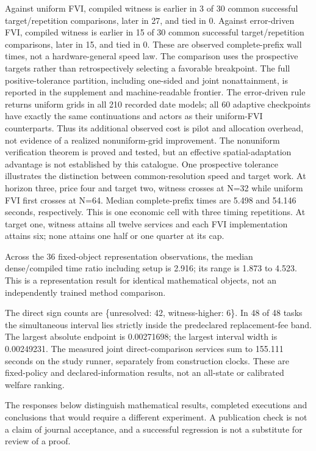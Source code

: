 \documentclass[ecta,nameyear,draft]{econsocart}
\begin{document}
Against uniform FVI, compiled witness is earlier in 3 of 30 common
successful target/repetition comparisons, later in 27, and tied in 0.
Against error-driven FVI, compiled witness is earlier in 15 of 30 common
successful target/repetition comparisons, later in 15, and tied in 0.
These are observed complete-prefix wall times, not a hardware-general
speed law. The comparison uses the prospective targets rather than
retrospectively selecting a favorable breakpoint. The full
positive-tolerance partition, including one-sided and joint
nonattainment, is reported in the supplement and machine-readable
frontier. The error-driven rule returns uniform grids in all 210
recorded date models; all 60 adaptive checkpoints have exactly the same
continuations and actors as their uniform-FVI counterparts. Thus its
additional observed cost is pilot and allocation overhead, not evidence
of a realized nonuniform-grid improvement. The nonuniform verification
theorem is proved and tested, but an effective spatial-adaptation
advantage is not established by this catalogue. One prospective
tolerance illustrates the distinction between common-resolution speed
and target work. At horizon three, price four and target two, witness
crosses at N=32 while uniform FVI first crosses at N=64. Median
complete-prefix times are 5.498 and 54.146 seconds, respectively. This
is one economic cell with three timing repetitions. At target one,
witness attains all twelve services and each FVI implementation attains
six; none attains one half or one quarter at its cap.

Across the 36 fixed-object representation observations, the median
dense/compiled time ratio including setup is 2.916; its range is 1.873
to 4.523. This is a representation result for identical mathematical
objects, not an independently trained method comparison.

The direct sign counts are
\{\textquotesingle unresolved\textquotesingle: 42,
\textquotesingle witness-higher\textquotesingle: 6\}. In 48 of 48 tasks
the simultaneous interval lies strictly inside the predeclared
replacement-fee band. The largest absolute endpoint is 0.00271698; the
largest interval width is 0.00249231. The measured joint
direct-comparison services sum to 155.111 seconds on the study runner,
separately from construction clocks. These are fixed-policy and
declared-information results, not an all-state or calibrated welfare
ranking.

The responses below distinguish mathematical results, completed
executions and conclusions that would require a different experiment. A
publication check is not a claim of journal acceptance, and a successful
regression is not a substitute for review of a proof.
\end{document}
